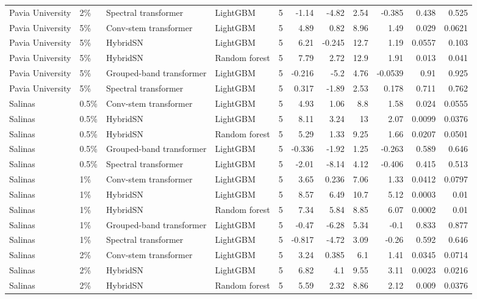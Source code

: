 \begin{table}
\begin{tabular}{llllrrrrrrr}
Pavia University & 2\% & Spectral transformer & LightGBM & 5 & -1.14 & -4.82 & 2.54 & -0.385 & 0.438 & 0.525 \\
Pavia University & 5\% & Conv-stem transformer & LightGBM & 5 & 4.89 & 0.82 & 8.96 & 1.49 & 0.029 & 0.0621 \\
Pavia University & 5\% & HybridSN & LightGBM & 5 & 6.21 & -0.245 & 12.7 & 1.19 & 0.0557 & 0.103 \\
Pavia University & 5\% & HybridSN & Random forest & 5 & 7.79 & 2.72 & 12.9 & 1.91 & 0.013 & 0.041 \\
Pavia University & 5\% & Grouped-band transformer & LightGBM & 5 & -0.216 & -5.2 & 4.76 & -0.0539 & 0.91 & 0.925 \\
Pavia University & 5\% & Spectral transformer & LightGBM & 5 & 0.317 & -1.89 & 2.53 & 0.178 & 0.711 & 0.762 \\
Salinas & 0.5\% & Conv-stem transformer & LightGBM & 5 & 4.93 & 1.06 & 8.8 & 1.58 & 0.024 & 0.0555 \\
Salinas & 0.5\% & HybridSN & LightGBM & 5 & 8.11 & 3.24 & 13 & 2.07 & 0.0099 & 0.0376 \\
Salinas & 0.5\% & HybridSN & Random forest & 5 & 5.29 & 1.33 & 9.25 & 1.66 & 0.0207 & 0.0501 \\
Salinas & 0.5\% & Grouped-band transformer & LightGBM & 5 & -0.336 & -1.92 & 1.25 & -0.263 & 0.589 & 0.646 \\
Salinas & 0.5\% & Spectral transformer & LightGBM & 5 & -2.01 & -8.14 & 4.12 & -0.406 & 0.415 & 0.513 \\
Salinas & 1\% & Conv-stem transformer & LightGBM & 5 & 3.65 & 0.236 & 7.06 & 1.33 & 0.0412 & 0.0797 \\
Salinas & 1\% & HybridSN & LightGBM & 5 & 8.57 & 6.49 & 10.7 & 5.12 & 0.0003 & 0.01 \\
Salinas & 1\% & HybridSN & Random forest & 5 & 7.34 & 5.84 & 8.85 & 6.07 & 0.0002 & 0.01 \\
Salinas & 1\% & Grouped-band transformer & LightGBM & 5 & -0.47 & -6.28 & 5.34 & -0.1 & 0.833 & 0.877 \\
Salinas & 1\% & Spectral transformer & LightGBM & 5 & -0.817 & -4.72 & 3.09 & -0.26 & 0.592 & 0.646 \\
Salinas & 2\% & Conv-stem transformer & LightGBM & 5 & 3.24 & 0.385 & 6.1 & 1.41 & 0.0345 & 0.0714 \\
Salinas & 2\% & HybridSN & LightGBM & 5 & 6.82 & 4.1 & 9.55 & 3.11 & 0.0023 & 0.0216 \\
Salinas & 2\% & HybridSN & Random forest & 5 & 5.59 & 2.32 & 8.86 & 2.12 & 0.009 & 0.0376 \\

\end{tabular}
\end{table}
